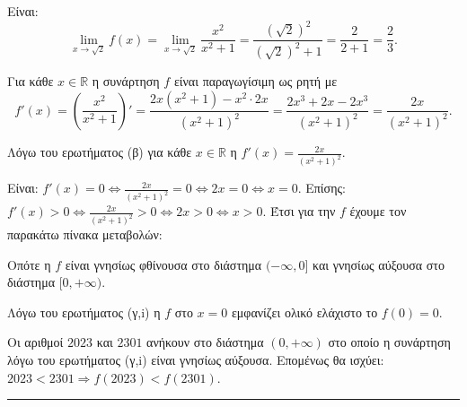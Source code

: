 \begin{alist}
    \item Είναι:
    \[ \lim\limits_{x\to\sqrt{2}} f(x) = \lim\limits_{x\to\sqrt{2}} \frac{x^2}{x^2+1} = \frac{(\sqrt{2})^2}{(\sqrt{2})^2+1} = \frac{2}{2+1} = \frac{2}{3}. \]

    \item Για κάθε $x \in \mathbb{R}$ η συνάρτηση $f$ είναι παραγωγίσιμη ως ρητή με
    \[ f'(x) = \left(\frac{x^2}{x^2+1}\right)' = \frac{2x(x^2+1) - x^2 \cdot 2x}{(x^2+1)^2} = \frac{2x^3+2x-2x^3}{(x^2+1)^2} = \frac{2x}{(x^2+1)^2}. \]

    \item Λόγω του ερωτήματος (β) για κάθε $x \in \mathbb{R}$ η $f'(x) = \frac{2x}{(x^2+1)^2}$.
    \begin{rlist}
        \item Είναι: $f'(x)=0 \Leftrightarrow \frac{2x}{(x^2+1)^2}=0 \Leftrightarrow 2x=0 \Leftrightarrow x=0$. Επίσης: $f'(x)>0 \Leftrightarrow \frac{2x}{(x^2+1)^2}>0 \Leftrightarrow 2x>0 \Leftrightarrow x>0$. Έτσι για την $f$ έχουμε τον παρακάτω πίνακα μεταβολών:
        \begin{center}
		\end{center}

        Οπότε η $f$ είναι γνησίως φθίνουσα στο διάστημα $(-\infty,0]$ και γνησίως αύξουσα στο διάστημα $[0,+\infty)$.

        \item Λόγω του ερωτήματος (γ,i) η $f$ στο $x=0$ εμφανίζει ολικό ελάχιστο το $f(0)=0$.
    \end{rlist}

    \item Οι αριθμοί $2023$ και $2301$ ανήκουν στο διάστημα $(0,+\infty)$ στο οποίο η συνάρτηση λόγω του ερωτήματος (γ,i) είναι γνησίως αύξουσα.
    Επομένως θα ισχύει: $2023 < 2301 \Rightarrow f(2023) < f(2301)$.
\end{alist}
\vspace{6mm}
\noindent\rule{\textwidth}{0.4pt}
\vspace{6mm}

